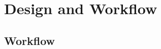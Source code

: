 
\section{Design and Workflow}
\label{sec:design}

%


\subsection{Workflow}
\label{subsec:SystemWorkflow}

